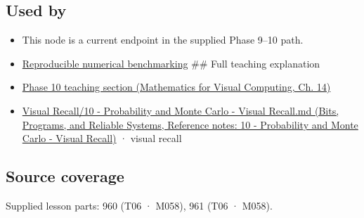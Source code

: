 \subsection{Used by}\label{appendix-c83016554b1e-used-by}

\begin{itemize}
\item
  This node is a current endpoint in the supplied Phase 9--10 path.
\item
  \hyperref[appendix-b9db93e28371]{Reproducible numerical benchmarking} \#\# Full teaching explanation
\item
  \href{../02-Mathematics-for-Visual-Computing/main.pdf\#nameddest=02-foundations-ii-ch030-inference-and-error-metrics-need-explicit-assumptions}{Phase 10 teaching section (Mathematics for Visual Computing, Ch. 14)}
\item
  \href{../01-Bits-Programs-and-Reliable-Systems/main.pdf\#nameddest=appendix-cb5af353ef77}{Visual Recall/10 - Probability and Monte Carlo - Visual Recall.md (Bits, Programs, and Reliable Systems, Reference notes: 10 - Probability and Monte Carlo - Visual Recall)} · visual recall
\end{itemize}

\subsection{Source coverage}\label{appendix-c83016554b1e-source-coverage}

Supplied lesson parts: 960 (T06 · M058), 961 (T06 · M058).
